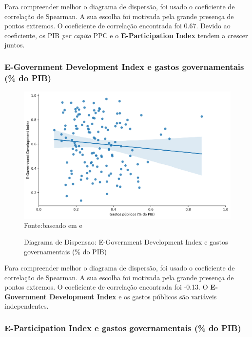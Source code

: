 Para compreender melhor o diagrama de dispersão, foi usado o coeficiente de correlação de Spearman. A sua escolha foi motivada pela grande presença de pontos extremos. O coeficiente de correlação encontrada foi 0.67. Devido ao coeficiente, os PIB \textit{per capita} PPC e o \textbf{E-Participation Index} tendem a crescer juntos.

\subsubsection{E-Government Development Index e gastos governamentais (\% do PIB)}

\begin{figure}[H]
	\centering
	\caption{Diagrama de Dispensao: E-Government Development Index e gastos governamentais (\% do PIB)}
	\includegraphics[width=1\linewidth]{figuras/egdi/dispersao_egov_govexpenditure}
	\label{fig:dispersao_egov_govexpenditure}
	\footnotesize{Fonte:baseado em \cite{ONU_EGDI_mapa} e \cite{FMI_gov_expenditure}}
\end{figure}

Para compreender melhor o diagrama de dispersão, foi usado o coeficiente de correlação de Spearman. A sua escolha foi motivada pela grande presença de pontos extremos. O coeficiente de correlação encontrada foi -0.13. O \textbf{E-Government Development Index} e os gastos públicos são variáveis independentes.

\subsubsection{E-Participation Index e gastos governamentais (\% do PIB)}

